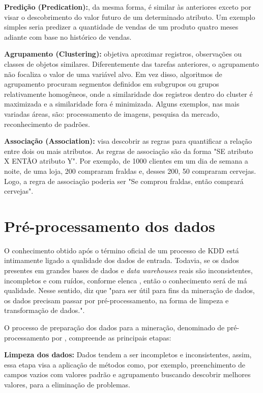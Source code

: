 \documentclass[projtg]{mdtufsm}
\begin{document}
\textbf{Predição (Predication):}, da mesma forma, é similar às anteriores exceto por visar o descobrimento do valor futuro de um determinado atributo. Um exemplo simples seria predizer a quantidade de vendas de um produto quatro meses adiante com base no histórico de vendas. 

\textbf{Agrupamento (Clustering):} objetiva aproximar registros, observações ou classes de objetos similares. Diferentemente das tarefas anteriores, o agrupamento não focaliza o valor de uma variável alvo. Em vez disso, algoritmos de agrupamento procuram segmentos definidos em subgrupos ou grupos relativamente homogêneos, onde a similaridade dos registros dentro do cluster é maximizada e a similaridade fora é minimizada. Alguns exemplos, nas mais variadas áreas, são: processamento de imagens, pesquisa da mercado, reconhecimento de padrões. 

\textbf{Associação (Association):} visa descobrir as regras para quantificar a relação entre dois ou mais atributos. As regras de associação são da forma "SE atributo X ENTÃO atributo Y". Por exemplo, de 1000 clientes em um dia de semana a noite, de uma loja, 200 compraram fraldas e, desses 200, 50 compraram cervejas. Logo, a regra de associação poderia ser "Se comprou fraldas, então comprará cervejas".


\section{Pré-processamento dos dados}

O conhecimento obtido após o término oficial de um processo de KDD está intimamente ligado a qualidade dos dados de entrada. Todavia, se os dados presentes em grandes bases de dados e \textit{data warehouses} reais são inconsistentes, incompletos e com ruídos, conforme elenca \cite{Han-kamber2nd}, então o conhecimento será de má qualidade. Nesse sentido, \cite{larose2005} diz que "para ser útil para fins da mineração de dados, os dados precisam passar por pré-processamento, na forma de limpeza e transformação de dados.".

O processo de preparação dos dados para a mineração, denominado de pré-processamento por \cite{Han-kamber2nd}, compreende as principais etapas:

\textbf{Limpeza dos dados:} Dados tendem a ser incompletos e inconsistentes, assim, essa etapa visa a aplicação de métodos como, por exemplo, preenchimento de campos vazios com valores padrão e agrupamento buscando descobrir melhores valores, para a eliminação de problemas. 
\end{document}
